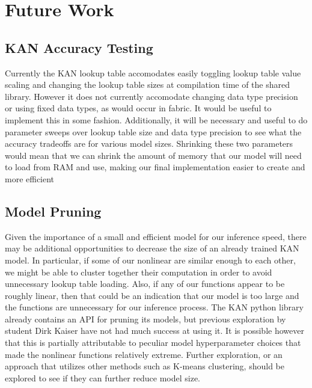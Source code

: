 \documentclass[psamsfonts]{amsart}
\theoremstyle{definition}
\theoremstyle{remark}
\numberwithin{equation}{section}
\begin{document}
\section{Future Work}
\subsection{KAN Accuracy Testing}
Currently the KAN lookup table accomodates easily toggling lookup table value scaling and changing the lookup table sizes at compilation time of the shared library. However it does not currently accomodate changing data type precision or using fixed data types, as would occur in fabric. It would be useful to implement this in some fashion. Additionally, it will be necessary and useful to do parameter sweeps over lookup table size and data type precision to see what the accuracy tradeoffs are for various model sizes. Shrinking these two parameters would mean that we can shrink the amount of memory that our model will need to load from RAM and use, making our final implementation easier to create and more efficient

\subsection{Model Pruning}
Given the importance of a small and efficient model for our inference speed, there may be additional opportunities to decrease the size of an already trained KAN model. In particular, if some of our nonlinear are similar enough to each other, we might be able to cluster together their computation in order to avoid unnecessary lookup table loading. Also, if any of our functions appear to be roughly linear, then that could be an indication that our model is too large and the functions are unnecessary for our inference process. The KAN python library already contains an API for pruning its models, but previous exploration by student Dirk Kaiser have not had much success at using it. It is possible however that this is partially attributable to peculiar model hyperparameter choices that made the nonlinear functions relatively extreme. Further exploration, or an approach that utilizes other methods such as K-means clustering, should be explored to see if they can further reduce model size.
\end{document}
